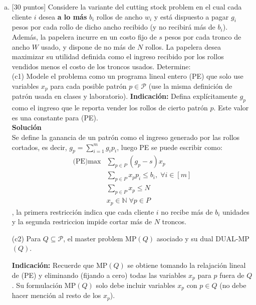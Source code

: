 \documentclass{article}
\theoremstyle{plain}
\theoremstyle{definition}
\theoremstyle{Azul}
\begin{document}
\begin{enumerate}[(a)]
\item {} [30 puntos] Considere la variante del cutting stock problem en el cual cada cliente $i$ desea \textbf{a lo más} $b_i$ rollos de ancho $w_i$ y está dispuesto a pagar $g_i$ pesos por cada rollo de dicho ancho recibido (y no recibirá más de $b_i$). Además, la papelera incurre en un costo fijo de $s$ pesos por cada tronco de ancho $W$ usado, y dispone de no más de $N$ rollos. La papelera desea maximizar su utilidad definida como el ingreso recibido por los rollos vendidos menos el costo de los troncos usados. Determine:\\[2pt]


(c1) Modele el problema como un programa lineal entero (PE) que solo use variables $x_p$ para cada posible patrón $p\in \mathcal{P}$ (use la misma definición de patrón usada en clases y laboratorio).
\textbf{Indicación:} Defina explícitamente $g_p$ como el ingreso que le reporta vender los rollos de cierto patrón $p$. Este valor es una constante para (PE).\\[2pt]

\textbf{Solución}\\
Se define la ganancia de un patrón como el ingreso generado por las rollos cortados, es decir, $g_{p}=\sum_{i=1}^{m}g_{i}p_{i}$, luego PE se puede escribir como:
\begin{align*}
    \text{(PE)} \max &\sum_{p\in P} (g_{p}-s)x_{p}\\
    & \sum_{p\in P}x_{p}p_{i}\leq b_{i}, \;\forall i\in[m]\\
    &\sum_{p\in P}x_{p}\leq N\\
    & x_p\in \mathbb{N}\;\forall p \in P
\end{align*}
, la primera restricción indica que cada cliente $i$ no recibe más de $b_{i}$ unidades y la segunda restriccion impide cortar más de $N$ troncos.


(c2) Para $Q\subseteq \mathcal{P}$, el master problem MP$(Q)$ asociado y su dual DUAL-MP$(Q)$.

\textbf{Indicación:} Recuerde que MP$(Q)$ se obtiene tomando la relajación lineal de (PE) y eliminando (fijando a cero) todas las variables $x_p$ para $p$ fuera de $Q$. Su formulación MP$(Q)$ solo debe incluir variables $x_p$ con $p\in Q$ (no debe hacer mención al resto de los $x_p$).\\[2pt]


\end{enumerate}
\end{document}
